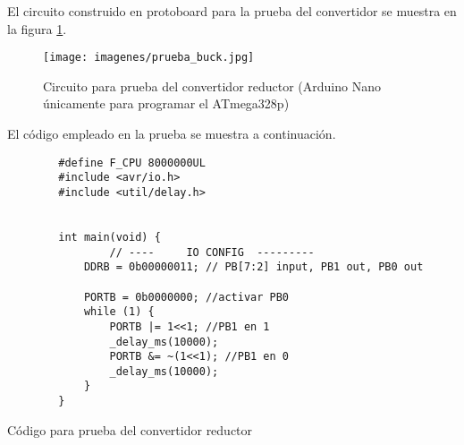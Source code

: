 El circuito construido en protoboard para la prueba del convertidor se muestra
en la figura \ref{fig:prueba_buck}.

\begin{figure}[H]	
    \centering
    \texttt{[image: imagenes/prueba\_buck.jpg]}
    \caption{Circuito para prueba del convertidor reductor (Arduino Nano únicamente
    para programar el ATmega328p)} 
    \label{fig:prueba_buck}
\end{figure}

El código empleado en la prueba se muestra a continuación.

\begin{table}[H]
    \begin{lstlisting}
        #define F_CPU 8000000UL
        #include <avr/io.h>
        #include <util/delay.h>


        int main(void) {
                // ----     IO CONFIG  ---------
            DDRB = 0b00000011; // PB[7:2] input, PB1 out, PB0 out
            
            PORTB = 0b0000000; //activar PB0
            while (1) {
                PORTB |= 1<<1; //PB1 en 1
                _delay_ms(10000);
                PORTB &= ~(1<<1); //PB1 en 0
                _delay_ms(10000);
            }
        }

    \end{lstlisting}
    \caption{Código para prueba del convertidor reductor}
\end{table}
